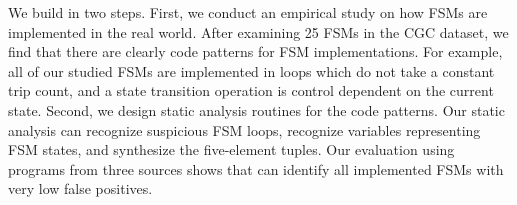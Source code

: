 We build \Tool in two steps. First, we conduct an empirical study 
on how FSMs are implemented in the real world. After examining 25 FSMs in the CGC 
dataset, we find that there are clearly code patterns for FSM implementations. 
For example, all of our studied FSMs are implemented in 
loops which do not take a constant trip count, and a state transition operation 
is control dependent on the current state. 
Second, we design static analysis routines for the code patterns.
Our static analysis can recognize suspicious FSM loops,
recognize variables representing FSM states, and synthesize the five-element tuples. 
Our evaluation using programs from three sources shows that
\Tool{} can identify all implemented FSMs with very low false positives. 





